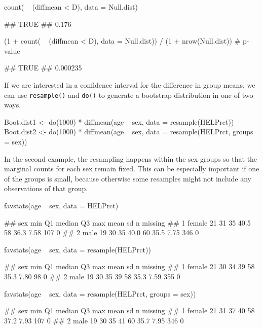 \begin{Schunk}
\begin{Sinput}
count( ~ (diffmean < D), data = Null.dist)
\end{Sinput}
\begin{Soutput}
##  TRUE 
## 0.176
\end{Soutput}
\begin{Sinput}
(1 + count( ~ (diffmean < D), data = Null.dist)) / (1 + nrow(Null.dist))  # p-value
\end{Sinput}
\begin{Soutput}
##     TRUE 
## 0.000235
\end{Soutput}
\end{Schunk}

If we are interested in a confidence interval for the difference in
group means, we can use \texttt{resample()} and \texttt{do()} to
generate a bootstrap distribution in one of two ways.

\begin{Schunk}
\begin{Sinput}
Boot.dist1 <- do(1000) * diffmean(age ~ sex, data = resample(HELPrct))
Boot.dist2 <- do(1000) * diffmean(age ~ sex, data = resample(HELPrct, groups = sex))
\end{Sinput}
\end{Schunk}

\noindent
In the second example, the resampling happens within the sex groups so
that the marginal counts for each sex remain fixed. This can be
especially important if one of the groups is small, because otherwise
some resamples might not include any observations of that group.

\begin{Schunk}
\begin{Sinput}
favstats(age ~ sex, data = HELPrct)
\end{Sinput}
\begin{Soutput}
##      sex min Q1 median   Q3 max mean   sd   n missing
## 1 female  21 31     35 40.5  58 36.3 7.58 107       0
## 2   male  19 30     35 40.0  60 35.5 7.75 346       0
\end{Soutput}
\begin{Sinput}
favstats(age ~ sex, data = resample(HELPrct))
\end{Sinput}
\begin{Soutput}
##      sex min Q1 median Q3 max mean   sd   n missing
## 1 female  21 30     34 39  58 35.3 7.80  98       0
## 2   male  19 30     35 39  58 35.3 7.59 355       0
\end{Soutput}
\begin{Sinput}
favstats(age ~ sex, data = resample(HELPrct, groups = sex))
\end{Sinput}
\begin{Soutput}
##      sex min Q1 median Q3 max mean   sd   n missing
## 1 female  21 31     37 40  58 37.2 7.93 107       0
## 2   male  19 30     35 41  60 35.7 7.95 346       0
\end{Soutput}
\end{Schunk}

